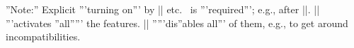 \documentclass[12pt,a4paper]{article}
\let\WE\wikiEnvironments
\let\WF\wikiFonts
\begin{document}

\footnotesize
\sloppy
\noindent \WE\WF %
''Note:''
Explicit '''turning on''' by %
|\wikiEnvironments| %
etc.\ 
is '''required''';
e.g., after %
|\tableofcontents|.
|\wikimarkup| '''activates ''all''''' the features. 
|\nowikimarkup| %
'''''dis''ables all''' of them, e.g., to get around incompatibilities. 
\end{document}
